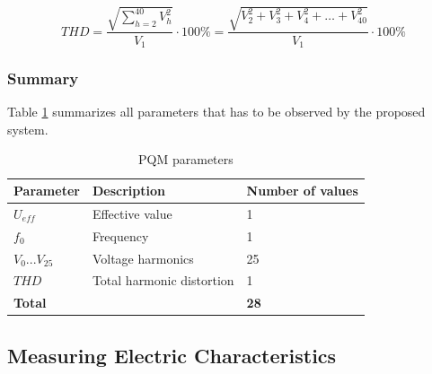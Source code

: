 \[ {THD} = \frac{\sqrt{\sum_{h=2}^{40} V_h^2}}{V_1} \cdot 100\% = \frac{\sqrt{V_2^2 + V_3^2 + V_4^2 + \dots + V_{40}^2}}{V_1} \cdot 100\% \]

\subsubsection{Summary}
Table \ref{tab:pqmparameters} summarizes all parameters that has to be observed by the proposed system.

\begin{table}[h]
	\centering
		\begin{tabular}{l|l|l}
			\hline
			\textbf{Parameter} & \textbf{Description} & \textbf{Number of values} \\
			\hline \hline
			$U_{eff}$ & Effective value & 1 \\
			\hline
			$f_0$ & Frequency & 1 \\
			\hline
			$V_0 ... V_{25}$ & Voltage harmonics & 25 \\
			\hline
			$THD$ & Total harmonic distortion & 1 \\
			\hline
			\hline
			\multicolumn{2}{l|}{\textbf{Total}} & \textbf{28} \\
			\hline
		\end{tabular}
	\caption{PQM parameters}
	\label{tab:pqmparameters}
\end{table}

\subsection{Measuring Electric Characteristics}
\label{electric_characteristics}

